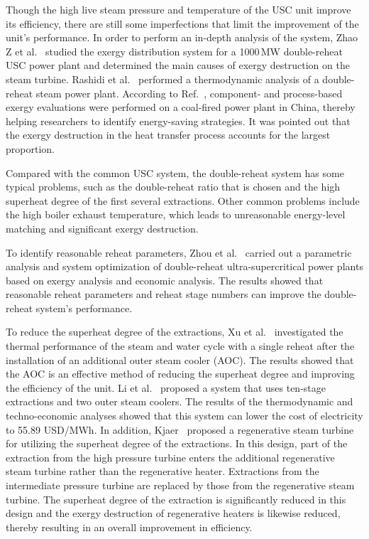 \documentclass[preprint,12pt]{elsarticle}
\begin{document}
  

Though the high live steam pressure and temperature of the USC unit improve its efficiency, there are still some imperfections that limit the improvement of the unit's performance. 
In order to perform an in-depth analysis of the system, Zhao Z et al.~\cite{Zhao2017Exergy} studied the exergy distribution system for a 1000\,MW double-reheat USC power plant and determined the main causes of exergy destruction on the steam turbine.
Rashidi et al.~\cite{Rashidi2014Thermodynamic} performed a thermodynamic analysis of a double-reheat steam power plant.
According to Ref.~\cite{Wu2014Component}, component- and process-based exergy evaluations were performed on a coal-fired power plant in China, thereby helping researchers to identify energy-saving strategies.
It was pointed out that the exergy destruction in the heat transfer process accounts for the largest proportion.

Compared with the common USC system, the double-reheat system has some typical problems, such as the double-reheat ratio that is chosen and the high superheat degree of the first several extractions.
Other common problems include the high boiler exhaust temperature, which leads to unreasonable energy-level matching and significant exergy destruction. 

To identify reasonable reheat parameters, Zhou et al.~\cite{Zhou2016Parametric} carried out a parametric analysis and system optimization of double-reheat ultra-supercritical power plants based on exergy analysis and economic analysis. The results showed that reasonable reheat parameters and reheat stage numbers can improve the double-reheat system's performance.


To reduce the superheat degree of the extractions, Xu et al.~\cite{Xu2015Optimum} investigated the thermal performance of the steam and water cycle with a single reheat after the installation of an additional outer steam cooler (AOC).
The results showed that the AOC is an effective method of reducing the superheat degree and improving the efficiency of the unit.
Li et al.~\cite{Li2014Thermodynamic} proposed a system that uses ten-stage extractions and two outer steam coolers. 
The results of the thermodynamic and techno-economic analyses showed that this system can lower the cost of electricity to 55.89 USD/MWh.
In addition, Kjaer~\cite{Kjaer2010A} proposed a regenerative steam turbine for utilizing the superheat degree of the extractions.
In this design, part of the extraction from the high pressure turbine enters the additional regenerative steam turbine rather than the regenerative heater.
Extractions from the intermediate pressure turbine are replaced by those from the regenerative steam turbine.
The superheat degree of the extraction is significantly reduced in this design and the exergy destruction of regenerative heaters is likewise reduced, thereby resulting in an overall improvement in efficiency.
\end{document}
